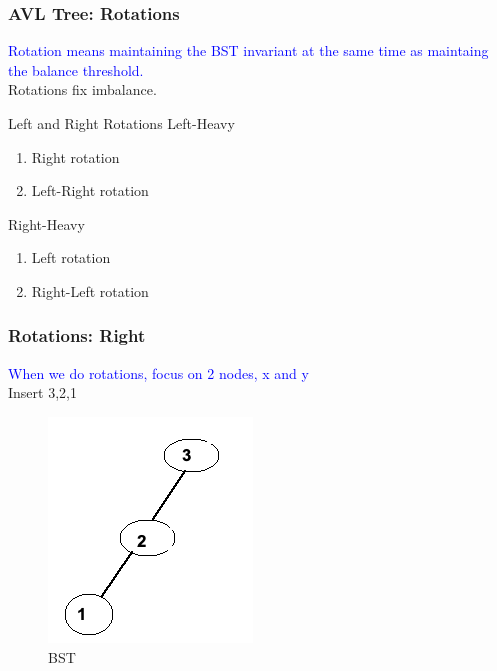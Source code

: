 \documentclass[11pt]{beamer}
\begin{document}
    \begin{frame}
    	\frametitle{AVL Tree: Rotations}
    	\textcolor{blue}{Rotation means maintaining the BST invariant at the same time as maintaing the balance threshold.}\\
    	Rotations fix imbalance.\\
    	\begin{block}{Left and Right Rotations}
    		\alert{Left-Heavy}
    		\begin{enumerate}
    			\item Right rotation
    			\item Left-Right rotation
    		\end{enumerate}
    		\alert{Right-Heavy}
    		\begin{enumerate}
    			\item Left rotation
    			\item Right-Left rotation
    		\end{enumerate}
    	\end{block}
    \end{frame}	

     \begin{frame}
    	\frametitle{Rotations: Right}
    	\textcolor{blue}{When we do rotations, focus on 2 nodes, x and y}\\
    	\alert{Insert 3,2,1}
        \begin{figure}
        	\centering
        	\includegraphics[width=0.5\linewidth]{"Screenshot 2020-11-24 at 10.21.20 AM"}
        	\caption{BST}
        	\label{fig:screenshot-2020-11-24-at-10}
        \end{figure}
        
    \end{frame}	
\end{document}
